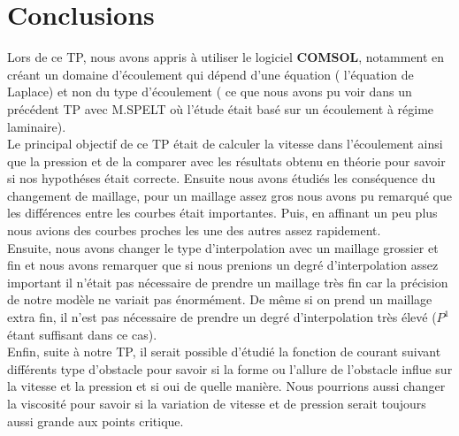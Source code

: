 \documentclass[a4paper,11pt]{report} %
\begin{document}
\pagebreak
\section{Conclusions}

Lors de ce TP, nous avons appris à utiliser le logiciel \textbf{COMSOL}, notamment en créant un domaine d'écoulement qui dépend d'une équation ( l'équation de Laplace) et non du type d'écoulement ( ce que nous avons pu voir dans un précédent TP avec M.SPELT où l'étude était basé sur un écoulement à régime laminaire).\\

Le principal objectif de ce TP était de calculer la vitesse dans l'écoulement ainsi que la pression et de la comparer avec les résultats obtenu en théorie pour savoir si nos hypothéses était correcte. Ensuite nous avons étudiés les conséquence du changement de maillage, pour un maillage assez gros nous avons pu remarqué que les différences entre les courbes était importantes. Puis, en affinant un peu plus nous avions des courbes proches les une des autres assez rapidement.\\

Ensuite, nous avons changer le type d'interpolation avec un maillage grossier et fin et nous avons remarquer que si nous prenions un degré d'interpolation assez important il n'était pas nécessaire de prendre un maillage très fin car la précision de notre modèle ne variait pas énormément. De même si on prend un maillage extra fin, il n'est pas nécessaire de prendre un degré d'interpolation très élevé ($P^1$ étant suffisant dans ce cas).\\

Enfin, suite à notre TP, il serait possible d'étudié la fonction de courant suivant différents type d'obstacle pour savoir si la forme ou l'allure de l'obstacle influe sur la vitesse et la pression et si oui de quelle manière. Nous pourrions aussi changer la viscosité pour savoir si la variation de vitesse et de pression serait toujours aussi grande aux points critique.



%
%	
\end{document}
